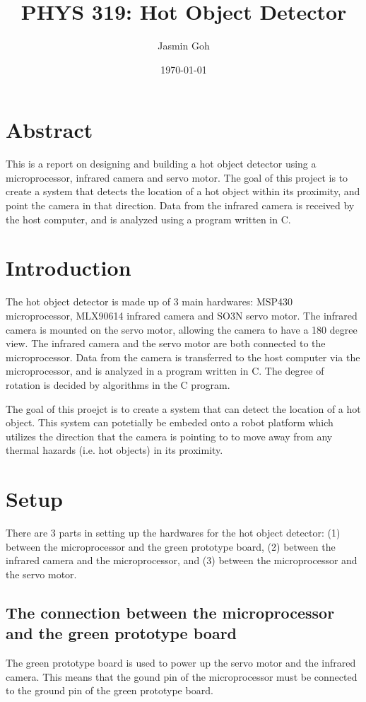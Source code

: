 \documentclass[12pt]{article}
\title{PHYS 319: Hot Object Detector}
\author{Jasmin Goh}
\date{\today}
\begin{document}
\maketitle

\section {Abstract}
This is a report on designing and building a hot object detector using a microprocessor, infrared camera and servo motor. The goal of this project is to create a system that detects the location of a hot object within its proximity, and point the camera in that direction. Data from the infrared camera is received by the host computer, and is analyzed using a program written in C.

\section {Introduction}
The hot object detector is made up of 3 main hardwares: MSP430 microprocessor, MLX90614 infrared camera and SO3N servo motor. The infrared camera is mounted on the servo motor, allowing the camera to have a 180 degree view. The infrared camera and the servo motor are both connected to the microprocessor. Data from the camera is transferred to the host computer via the microprocessor, and is analyzed in a program written in C. The degree of rotation is decided by algorithms in the C program.

The goal of this proejct is to create a system that can detect the location of a hot object. This system can potetially be embeded onto a robot platform which utilizes the direction that the camera is pointing to to move away from any thermal hazards (i.e. hot objects) in its proximity.

\section {Setup}
There are 3 parts in setting up the hardwares for the hot object detector: (1) between the microprocessor and the green prototype board, (2) between the infrared camera and the microprocessor, and (3) between the microprocessor and the servo motor.

\subsection {The connection between the microprocessor and the green prototype board}
The green prototype board is used to power up the servo motor and the infrared camera. This means that the gound pin of the microprocessor must be connected to the ground pin of the green prototype board.
\end{document}
